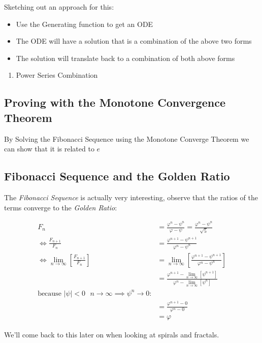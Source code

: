 \documentclass[11pt]{article}
\begin{document}
Sketching out an approach for this:

\begin{itemize}
\item Use the Generating function to get an ODE
\item The ODE will have a solution that is a combination of the above two forms
\item The solution will translate back to a combination of both above forms
\end{itemize}
\begin{enumerate}
\item Power Series Combination
\label{power-series-comb}
\end{enumerate}
\subsection{Proving with the Monotone Convergence Theorem}
\label{sec:org55996e2}
By Solving the Fibonacci Sequence using the Monotone Converge Theorem we can show that it is related to \(e\)
\subsection{Fibonacci Sequence and the Golden Ratio}
\label{fib-golden-ratio-proof}
The \emph{Fibonacci Sequence} is actually very interesting, observe that the ratios of the terms converge to the \emph{Golden Ratio}:

\begin{align*}
    F_n &= \frac{\varphi^n-\psi^n}{\varphi-\psi} = \frac{\varphi^n-\psi^n}{\sqrt 5} \\
    \iff \frac{F_{n+1}}{F_n}	&= \frac{\varphi^{n+ 1} - \psi^{n+  1}}{\varphi^{n} - \psi^{n}} \\
    \iff \lim_{n \rightarrow \infty}\left[ \frac{F_{n+1}}{F_n} \right]	&= \lim_{n \rightarrow \infty}\left[ \frac{\varphi^{n+ 1} - \psi^{n+  1}}{\varphi^{n} - \psi^{n}} \right] \\
&= \frac{\varphi^{n+ 1} -\lim_{n \rightarrow \infty}\left[ \psi^{n +  1} \right] }{\varphi^{n} - \lim_{n \rightarrow \infty}\left[ \psi^n \right] } \\
\text{because $\mid \psi \mid < 0$ $n \rightarrow \infty \implies \psi^{n} \rightarrow 0$:} \\
&= \frac{\varphi^{n+  1} -  0}{\varphi^{n} -  0} \\
&= \varphi
\end{align*}

We'll come back to this later on when looking at spirals and fractals.
\end{document}
